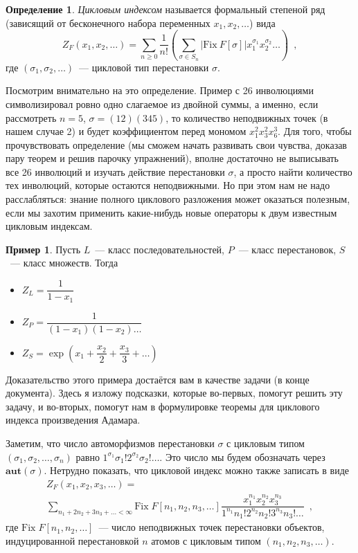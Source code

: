 \documentclass[a5paper]{article}
\theoremstyle{definition}
\newtheorem{example}{Пример}
\newtheorem*{definition}{Определение}
\begin{document}
\begin{definition}
	\textit{Цикловым индексом} называется формальный степеной ряд (зависящий от 
	бесконечного набора переменных \( x_1, x_2, \ldots \)) вида
	\[
		Z_F(x_1, x_2, \ldots) = \sum_{n \geq 0} \dfrac{1}{n!} \left(
			\sum_{\sigma \in S_n} |\mathrm{Fix}\ F[\sigma]|x_1^{\sigma_1} 
			x_2^{\sigma_2} \ldots
		\right) \enspace ,
	\]
	где \( (\sigma_1, \sigma_2, \ldots) \)~--- цикловой тип перестановки \( 
	\sigma \).
\end{definition}

Посмотрим внимательно на это определение. Пример с 26 инволюциями символизировал
ровно одно слагаемое из двойной суммы, а именно, если рассмотреть \( n = 5 \),
\( \sigma = (12)(345) \), то количество неподвижных точек (в нашем случае 2) и
будет коэффициентом перед мономом \( x_1^2 x_3^2 x_6^3 \). Для того, чтобы
прочувствовать определение (мы сможем начать развивать свои чувства, доказав
пару теорем и решив парочку упражнений), вполне достаточно не выписывать все 26
инволюций и изучать действие перестановки \( \sigma \),  а просто найти
количество тех инволюций, которые остаются неподвижными. Но при этом нам не надо
расслабляться: знание полного циклового разложения может оказаться полезным,
если мы захотим применить какие-нибудь новые операторы к двум известным цикловым
индексам.

\begin{example}
	Пусть \( L \)~--- класс последовательностей, \( P \)~--- класс 
	перестановок, \( S \)~--- класс множеств. Тогда
	\begin{itemize}
		\item	\( Z_L = \dfrac{1}{1 - x_1} \)
		\item 	\( Z_P = \dfrac{1}{(1-x_1)(1-x_2)\ldots} \)
		\item   \( Z_S = \exp \left(
			x_1 + \dfrac{x_2}{2} + \dfrac{x_3}{3} + \ldots
		\right) \)
	\end{itemize}
\end{example}

Доказательство этого примера достаётся вам в качестве задачи (в конце
документа). Здесь я изложу подсказки, которые во-первых, помогут решить эту
задачу, и во-вторых, помогут нам в формулировке теоремы для циклового индекса
произведения Адамара.

Заметим, что число автоморфизмов перестановки \( \sigma \) с цикловым типом \(
(\sigma_1, \sigma_2, \ldots, \sigma_n) \) равно \( 1^{\sigma_1}
\sigma_1! 2^{\sigma_2} \sigma_2! \ldots \). Это число мы будем обозначать через
\( \mathbf{aut}(\sigma) \). Нетрудно показать, что цикловой индекс можно также
записать в виде
\begin{multline*}
    Z_F(x_1, x_2, x_3, \ldots) =\\ \sum_{n_1 + 2n_2 + 3n_3 + \ldots < \infty}
\mathrm{Fix}\; F[n_1, n_2, n_3, \ldots] \dfrac{x_1^{n_1} x_2^{n_2}
x_3^{n_3}}{1^{n_1} n_1! 2^{n_2} n_2! 3^{n_3} n_3! \ldots} \enspace ,
\end{multline*}
где \( \mathrm{Fix}\; F[n_1, n_2, \ldots] \)~--- число неподвижных точек
перестановки объектов, индуцированной перестановкой \( n \) атомов с цикловым типом \(
(n_1, n_2, n_3, \ldots ) \).
\end{document}
